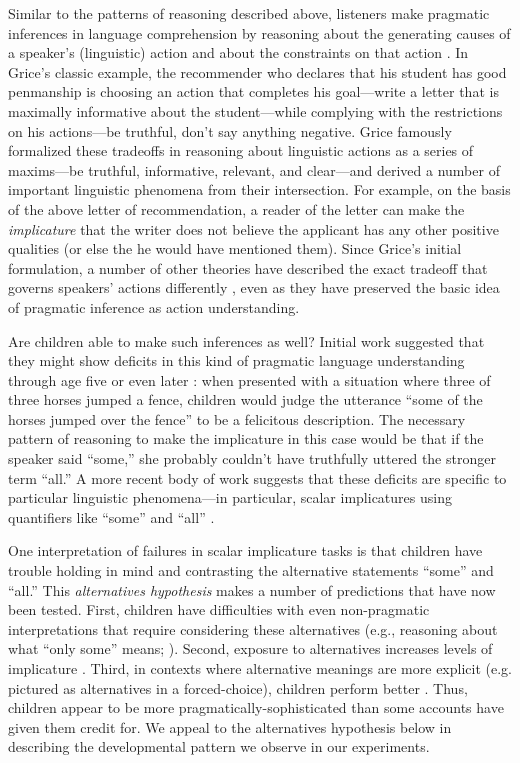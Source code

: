 \documentclass[man]{apa2}
\begin{document}

Similar to the patterns of reasoning described above, listeners make pragmatic inferences in language comprehension by reasoning about the generating causes of a speaker's (linguistic) action and about the constraints on that action \cite{shafto2012}. In Grice's \citeyear{grice1975} classic example, the recommender who declares that his student has good penmanship is choosing an action that completes his goal---write a letter that is maximally informative about the student---while complying with the restrictions on his actions---be truthful, don't say anything negative. Grice famously formalized these tradeoffs in reasoning about linguistic actions as a series of maxims---be truthful, informative, relevant, and clear---and derived a number of important linguistic phenomena from their intersection. For example, on the basis of the above letter of recommendation, a reader of the letter can make the \emph{implicature} that the writer does not believe the applicant has any other positive qualities (or else the he would have mentioned them). Since Grice's initial formulation, a number of other theories have described the exact tradeoff that governs speakers' actions differently \cite{horn1984,sperber1986,clark1996,levinson2000}, even as they have preserved the basic idea of pragmatic inference as action understanding.

Are children able to make such inferences as well?  Initial work suggested that they might show deficits in this kind of pragmatic language understanding through age five or even later \cite{noveck2000,papafragou2003}: when presented with a situation where three of three horses jumped a fence, children would judge the utterance ``some of the horses jumped over the fence'' to be a felicitous description. The necessary pattern of reasoning to make the implicature in this case would be that if the speaker said ``some,'' she probably couldn't have truthfully uttered the stronger term ``all.'' A more recent body of work suggests that these deficits are specific to particular linguistic phenomena---in particular, scalar implicatures using quantifiers like ``some'' and ``all'' \cite{barner2011,katsos2011}. 

One interpretation of failures in scalar implicature tasks is that children have trouble holding in mind and contrasting the alternative statements ``some'' and ``all.'' This \emph{alternatives hypothesis} makes a number of predictions that have now been tested. First, children have difficulties with even non-pragmatic interpretations that require considering these alternatives (e.g., reasoning about what ``only some'' means; ). Second, exposure to alternatives increases levels of implicature \cite{skordos2014}. Third, in contexts where alternative meanings are more explicit (e.g. pictured as alternatives in a forced-choice), children perform better \cite{miller2005,stiller2014}. Thus, children appear to be more pragmatically-sophisticated than some accounts have given them credit for. We appeal to the alternatives hypothesis below in describing the developmental pattern we observe in our experiments. 
\end{document}
